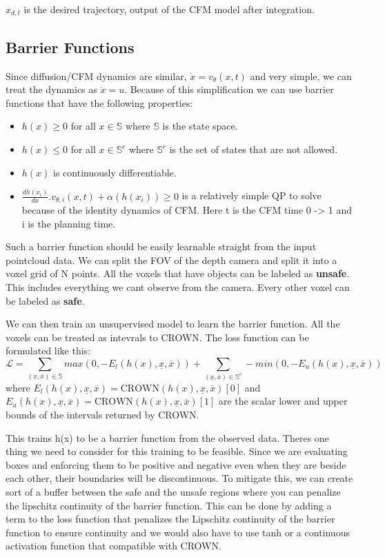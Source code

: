 \documentclass[12pt]{article}
\begin{document}
\(x_{d,t}\) is the desired trajectory, output of the CFM model after integration.

\subsection{Barrier Functions}
Since diffusion/CFM dynamics are similar, \(\dot{x} = v_{\theta}(x,t)\) and very simple, we can treat the dynamics as \(\dot{x} = u\). Because of this simplification we can use barrier functions that have the following properties:
\begin{itemize}
    \item \(h(x) \geq 0\) for all \(x \in \mathbb{S}\) where \(\mathbb{S}\) is the state space.
    \item \(h(x) \leq 0\) for all \(x \in \mathbb{S}^c\) where \(\mathbb{S}^c\) is the set of states that are not allowed.
    \item \(h(x)\) is continuously differentiable. 
    \item \(\frac{dh(x_{i})}{dx}.v_{\theta,i}(x,t) + \alpha(h(x_{i})) \geq 0\) is a relatively simple QP to solve because of the identity dynamics of CFM. Here t is the CFM time 0 -> 1 and i is the planning time.
\end{itemize}

Such a barrier function should be easily learnable straight from the input pointcloud data. We can split the FOV of the depth camera and split it into a voxel grid of N points. All the voxels that have objects can be labeled as \textbf{unsafe}. This includes everything we cant observe from the camera. 
Every other voxel can be labeled as \textbf{safe}.

We can then train an unsupervised model to learn the barrier function. All the voxels can be treated as intevrals to CROWN. The loss function can be formulated like this:
\[\mathcal{L} = \sum_{(\underline{x},\overline{x}) \in \mathbb{S}} max(0, -E_{l}(h(x), \underline{x}, \overline{x})) + \sum_{(\underline{x},\overline{x}) \in \mathbb{S}^c} -min(0, -E_{u}(h(x), \underline{x}, \overline{x}))\]
where \(E_{l}(h(x), \underline{x}, \overline{x}) = \text{CROWN}(h(x), \underline{x}, \overline{x})[0]\) and \(E_{u}(h(x), \underline{x}, \overline{x}) = \text{CROWN}(h(x), \underline{x}, \overline{x})[1]\) are the scalar lower and upper bounds of the intervals returned by CROWN.

This trains h(x) to be a barrier function from the observed data. Theres one thing we need to consider for this training to be feasible. Since we are evaluating boxes and enforcing them to be positive and negative even when they are beside each other, their boundaries will be discontinuous. 
To mitigate this, we can create sort of a buffer between the safe and the unsafe regions where you can penalize the lipschitz continuity of the barrier function. This can be done by adding a term to the loss function that penalizes the Lipschitz continuity of the barrier function to ensure continuity and we would also have to use tanh or 
a continuous activation function that compatible with CROWN. 
\end{document}
